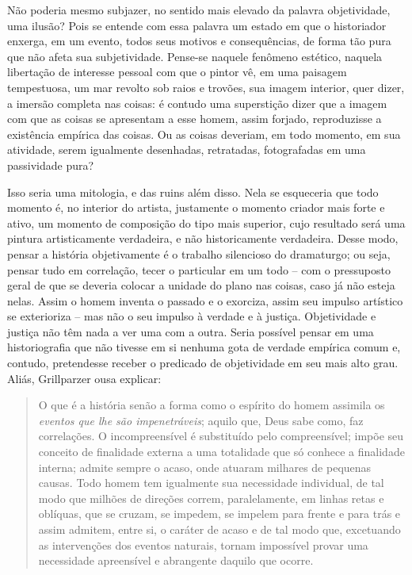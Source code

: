 Não poderia mesmo subjazer, no sentido mais elevado da palavra
objetividade, uma ilusão? Pois se entende com essa palavra um estado em
que o historiador enxerga, em um evento, todos seus motivos e
consequências, de forma tão pura que não afeta sua subjetividade.
Pense-se naquele fenômeno estético, naquela libertação de interesse
pessoal com que o pintor vê, em uma paisagem tempestuosa, um mar revolto
sob raios e trovões, sua imagem interior, quer dizer, a imersão completa
nas coisas: é contudo uma superstição dizer que a imagem com que as
coisas se apresentam a esse homem, assim forjado, reproduzisse a
existência empírica das coisas. Ou as coisas deveriam, em todo momento,
em sua atividade, serem igualmente desenhadas, retratadas, fotografadas em
uma passividade pura?

Isso seria uma mitologia, e das ruins além disso. Nela se esqueceria que
todo momento é, no interior do artista, justamente o momento criador
mais forte e ativo, um momento de composição do tipo mais superior, cujo
resultado será uma pintura artisticamente verdadeira, e não
historicamente verdadeira. Desse modo, pensar a história objetivamente é
o trabalho silencioso do dramaturgo; ou seja, pensar tudo em correlação,
tecer o particular em um todo -- com o pressuposto geral de que se deveria
colocar a unidade do plano nas coisas, caso já não esteja nelas. Assim o
homem inventa o passado e o exorciza, assim seu impulso artístico se
exterioriza -- mas não o seu impulso à verdade e à justiça. Objetividade
e justiça não têm nada a ver uma com a outra. Seria possível pensar em
uma historiografia que não tivesse em si nenhuma gota de verdade
empírica comum e, contudo, pretendesse receber o predicado de objetividade
em seu mais alto grau. Aliás, Grillparzer ousa explicar:

\begin{quote} 
O que é a história senão a forma como o espírito do homem assimila os
\emph{eventos que lhe são impenetráveis}; aquilo que, Deus sabe como,
faz correlações. O incompreensível é substituído pelo compreensível;
impõe seu conceito de finalidade externa a uma totalidade que só conhece
a finalidade interna; admite sempre o acaso, onde atuaram milhares de
pequenas causas. Todo homem tem igualmente sua necessidade individual,
de tal modo que milhões de direções correm, paralelamente, em linhas retas
e oblíquas, que se cruzam, se impedem, se impelem para frente e para
trás e assim admitem, entre si, o caráter de acaso e de tal modo que,
excetuando as intervenções dos eventos naturais, tornam impossível
provar uma necessidade apreensível e abrangente daquilo que ocorre.
\end{quote}

